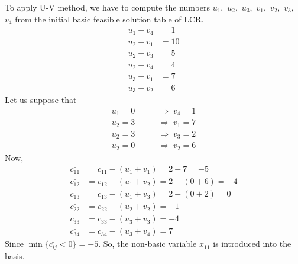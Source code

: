 \documentclass[../main-sheet.tex]{subfiles}
\begin{document}
To apply U-V method, we have to compute the numbers \(u_1,\) \(u_2,\) \(u_3,\) \(v_1,\) \(v_2,\) \(v_3,\) \(v_4\) from the initial basic feasible solution table of LCR.
\begin{align*}
    u_1+v_4&=1\\
    u_2+v_1&=10\\
    u_2+v_3&=5\\
    u_2+v_4&=4\\
    u_3+v_1&=7\\
    u_3+v_2&=6
\end{align*}
Let us suppose that 
\begin{align*}
    u_1=0\qquad&\Rightarrow\;v_4=1\\
    u_2=3\qquad&\Rightarrow\;v_1=7\\
    u_2=3\qquad&\Rightarrow\;v_3=2\\
    u_2=0\qquad&\Rightarrow\;v_2=6
\end{align*}
Now,
\begin{align*}
    \bar{c_{11}}&=c_{11}-(u_1+v_1)=2-7=-5\\
    \bar{c_{12}}&=c_{12}-(u_1+v_2)=2-(0+6)=-4\\
    \bar{c_{13}}&=c_{13}-(u_1+v_3)=2-(0+2)=0\\
    \bar{c_{22}}&=c_{22}-(u_2+v_2)=-1\\
    \bar{c_{33}}&=c_{33}-(u_3+v_3)=-4\\
    \bar{c_{34}}&=c_{34}-(u_3+v_4)=7
\end{align*}
Since \(\min\{\bar{c_{ij}}<0\}=-5\). So, the non-basic variable \(x_{11}\) is introduced into the basis.
\end{document}
